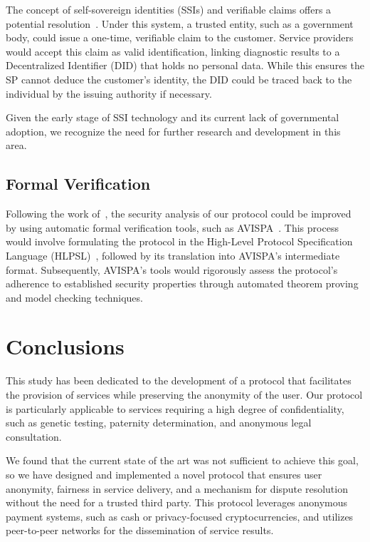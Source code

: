 \documentclass[pdftex,twocolumn,epjc3]{svjour3}
\begin{document}
The concept of self-sovereign identities (SSIs) and verifiable claims offers a potential resolution~\cite{muhleSurveyEssentialComponents2018}. Under this system, a trusted entity, such as a government body, could issue a one-time, verifiable claim to the customer. Service providers would accept this claim as valid identification, linking diagnostic results to a Decentralized Identifier (DID) that holds no personal data. While this ensures the SP cannot deduce the customer's identity, the DID could be traced back to the individual by the issuing authority if necessary.

Given the early stage of SSI technology and its current lack of governmental adoption, we recognize the need for further research and development in this area.

\subsection{Formal Verification}\label{sec:formal-verification}
Following the work of~\cite{birjoveanuFormalVerificationMultiparty2022}, the security analysis of our protocol could be improved by using automatic formal verification tools, such as AVISPA~\cite{armandoAVISPAToolAutomated2005}. This process would involve formulating the protocol in the High-Level Protocol Specification Language (HLPSL)~\cite{chevalierHighLevelProtocol2004}, followed by its translation into AVISPA's intermediate format. Subsequently, AVISPA's tools would rigorously assess the protocol's adherence to established security properties through automated theorem proving and model checking techniques.

\section{Conclusions}\label{sec:conclusion}

This study has been dedicated to the development of a protocol that facilitates the provision of services while preserving the anonymity of the user. Our protocol is particularly applicable to services requiring a high degree of confidentiality, such as genetic testing, paternity determination, and anonymous legal consultation.

We found that the current state of the art was not sufficient to achieve this goal, so we have designed and implemented a novel protocol that ensures user anonymity, fairness in service delivery, and a mechanism for dispute resolution without the need for a trusted third party. This protocol leverages anonymous payment systems, such as cash or privacy-focused cryptocurrencies, and utilizes peer-to-peer networks for the dissemination of service results.
\end{document}
